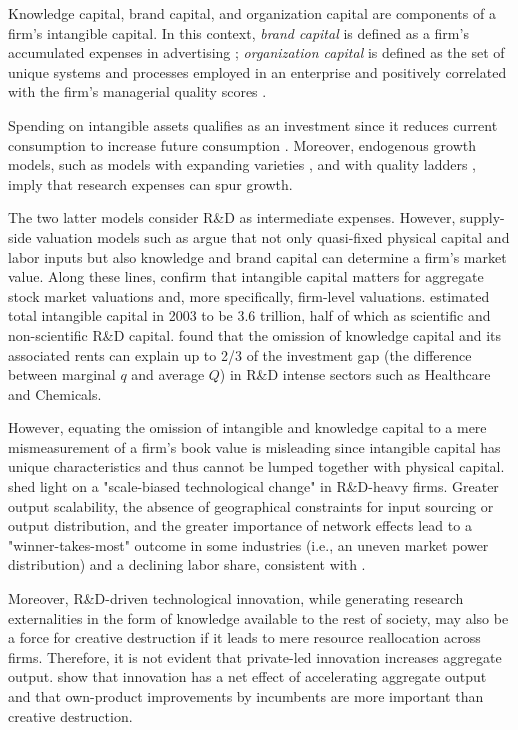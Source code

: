 \documentclass[12pt, letterpaper]{article}
\begin{document}
Knowledge capital, brand capital, and organization capital are components of a firm's intangible capital. In this context, \emph{brand capital} is defined as a firm's accumulated expenses in advertising \citep{Belo2019-iz}; \emph{organization capital} is defined as the set of unique systems and processes employed in an enterprise and positively correlated with the firm's managerial quality scores \citep{Eisfeldt2013-ad, Bloom2007-gl}. 

 Spending on intangible assets qualifies as an investment since it reduces current consumption to increase future consumption \citep{Corrado2009-kd, Corrado2009-hk}. Moreover, endogenous growth models, such as models with expanding varieties \citep{Romer1990-tw}, and with quality ladders \citep{Grossman1991-pz, Atkeson2019-wz}, imply that research expenses can spur growth.

The two latter models consider R\&D as intermediate expenses. However, supply-side valuation models such as \citep{Belo2013-ys} argue that not only quasi-fixed physical capital and labor inputs but also knowledge and brand capital can determine a firm's market value. 
Along these lines, \cite{Hall2001-ni, McGrattan2001-kc, Vitorino2014-yd, Eisfeldt2020-ec, Li2014-zp} confirm that intangible capital matters for aggregate stock market valuations and, more specifically, firm-level valuations. \citep{Corrado2009-kd} estimated total intangible capital in 2003 to be 3.6 trillion, half of which as scientific and non-scientific R\&D capital. \citep{Crouzet2022-ic} found that the omission of knowledge capital and its associated rents can explain up to 2/3 of the investment gap (the difference between marginal $q$ and average $Q$) in R\&D intense sectors such as Healthcare and Chemicals.

However, equating the omission of intangible and knowledge capital to a mere mismeasurement of a firm's book value is misleading since intangible capital has unique characteristics and thus cannot be lumped together with physical capital. \citep{Autor2020-rw, Unger2019-ip} shed light on a "scale-biased technological change" in R\&D-heavy firms. Greater output scalability, the absence of geographical constraints for input sourcing or output distribution, and the greater importance of network effects lead to a "winner-takes-most" outcome in some industries (i.e., an uneven market power distribution) and a declining labor share, consistent with \citep{Barkai2020-gi}.

Moreover, R\&D-driven technological innovation, while generating research externalities in the form of knowledge available to the rest of society, may also be a force for creative destruction \citep{Schumpeter1939-er} if it leads to mere resource reallocation across firms. Therefore, it is not evident that private-led innovation increases aggregate output. \citep{Kogan2017-fx, Garcia-Macia2019-mg} show that innovation has a net effect of accelerating aggregate output and that own-product improvements by incumbents are more important than creative destruction.
\end{document}
